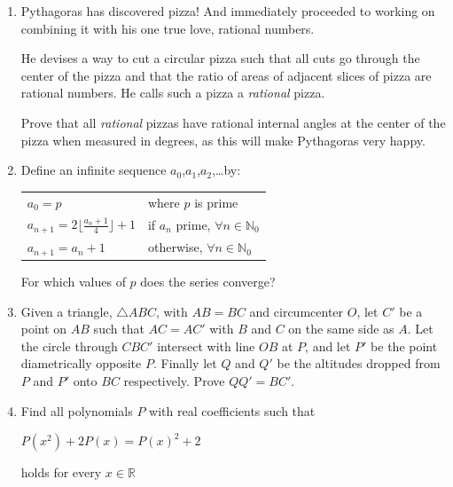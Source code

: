 \documentclass{article}
\begin{document}
\begin{enumerate}

\medskip
\item %
Pythagoras has discovered pizza! And immediately proceeded to working on combining it with his one true love, rational numbers.

He devises a way to cut a circular pizza such that all cuts go through the center of the pizza and that the ratio of areas of adjacent slices of pizza are rational numbers. He calls such a pizza a \textit{rational} pizza.

Prove that all \textit{rational} pizzas have rational internal angles at the center of the pizza when measured in degrees, as this will make Pythagoras very happy.

\medskip
\item %
Define an infinite sequence $a_0$,$a_1$,$a_2$,\ldots by:
\begin{center}
\begin{tabular}{ l l }
    $a_0 = p$ & where $p$ is prime
    \\$a_{n+1} = 2\lfloor \frac{a_n+1}{4}\rfloor + 1$ & if $a_n$ prime, $\forall n \in \mathbb{N}_0$
    \\$a_{n+1} = a_{n} + 1$ & otherwise, $\forall n \in \mathbb{N}_0$
    
\end{tabular}
\end{center}
For which values of $p$ does the series converge?

\medskip
\item %
Given a triangle, $\triangle ABC$, with $AB = BC$ and circumcenter $O$, let $C'$ be a point on $AB$ such that $AC = AC'$ with $B$ and $C$ on the same side as $A$. Let the circle through $CBC'$ intersect with line $OB$ at $P$, and let $P'$ be the point diametrically opposite $P$. Finally let $Q$ and $Q'$ be the altitudes dropped from $P$ and $P'$ onto $BC$ respectively. Prove $QQ' = BC'$.

\medskip
\item %
Find all polynomials $P$ with real coefficients such that
\begin{center}
    $P(x^2) + 2P(x) = {P(x)}^2 + 2$
\end{center}
holds for every $x\in\mathbb{R}$


\end{enumerate}
\end{document}

